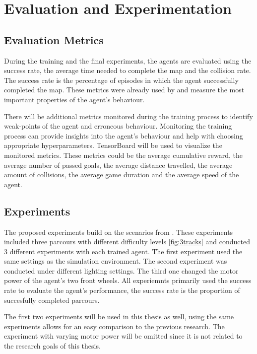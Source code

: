 \chapter{Evaluation and Experimentation}

\section{Evaluation Metrics}

During the training and the final experiments, the agents are evaluated using the success rate, the average time needed to complete the map and the collision rate. The success rate is the percentage of episodes in which the agent successfully completed the map. These metrics were already used by \autocite{maximilian} and measure the most important properties of the agent's behaviour.

There will be additional metrics monitored during the training process to identify weak-points of the agent and erroneous behaviour. Monitoring the training process can provide insights into the agent's behaviour and help with choosing appropriate hyperparameters. TensorBoard will be used to visualize the monitored metrics.
These metrics could be the average cumulative reward, the average number of passed goals, the average distance travelled, the average amount of collisions, the average game duration and the average speed of the agent.

\section{Experiments}

The proposed experiments build on the scenarios from \autocite{maximilian}. These experiments included three parcours with different difficulty levels \ref{fig:3tracks} and conducted 3 different experiments with each trained agent. The first experiment used the same settings as the simulation environment. The second experiment was conducted under different lighting settings. The third one changed the motor power of the agent's two front wheels. All experiemnts primarily used the success rate to evaluate the agent's performance, the success rate is the proportion of succesfully completed parcours.

The first two experiments will be used in this thesis as well, using the same experiments allows for an easy comparison to the previous research. The experiment with varying motor power will be omitted since it is not related to the research goals of this thesis.




